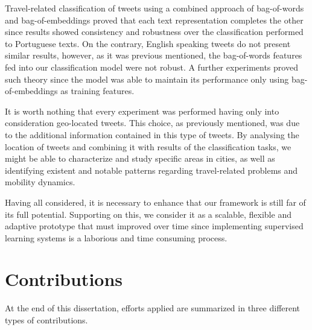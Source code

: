 Travel-related classification of tweets using a combined approach of bag-of-words and bag-of-embeddings proved that each text representation completes the other since results showed consistency and robustness over the classification performed to Portuguese texts. On the contrary, English speaking tweets do not present similar results, however, as it was previous mentioned, the bag-of-words features fed into our classification model were not robust. A further experiments proved such theory since the model was able to maintain its performance only using bag-of-embeddings as training features.

It is worth nothing that every experiment was performed having only into consideration geo-located tweets. This choice, as previously mentioned, was due to the additional information contained in this type of tweets. By analysing the location of tweets and combining it with results of the classification tasks, we might be able to characterize and study specific areas in cities, as well as identifying existent and notable patterns regarding travel-related problems and mobility dynamics.

Having all considered, it is necessary to enhance that our framework is still far of its full potential. Supporting on this, we consider it as a scalable, flexible and adaptive prototype that must improved over time since implementing supervised learning systems is a laborious and time consuming process.

\section{Contributions}

At the end of this dissertation, efforts applied are summarized in three different types of contributions.

